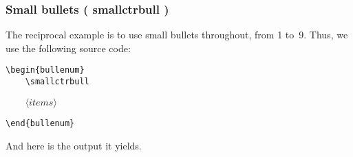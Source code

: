 \documentclass[a4paper]{article}
\DeclareRobustCommand*{\command}[1]{%
	{\texorpdfstring{\normalfont\ttfamily \char\escapechar}{\pdfbslash}#1}%
}
\DeclareRobustCommand*{\meta}[1]{\mbox{\(\langle\textit{#1}\rangle\)}}
\newcommand*{\pdfbslash}{}
{\catcode`\|=0 |catcode`|\=12 |gdef|pdfbslash{\\}}
\begin{document}
\subsubsection{Small bullets (\command{smallctrbull})}
\label{SSS:Xmp-Small}

The reciprocal example is to use small bullets throughout, from 1 to~9.
Thus, we use the following source code:
%
\begin{verbatim}
\begin{bullenum}
    \smallctrbull
\end{verbatim}
\begin{flushleft}
	\texttt{\ \ \ \ }\meta{items}
\end{flushleft}
\begin{verbatim}
\end{bullenum}
\end{verbatim}
%
And here is the output it yields.
\end{document}
